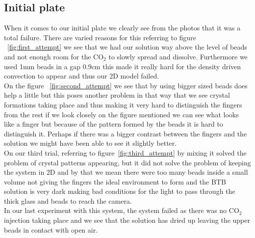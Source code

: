 \documentclass[twoside]{article}
\begin{document}
\begin{multicols}{2}
\subsection{Initial plate}
When it comes to our initial plate we clearly see from the photos that it was a total failure. There are varied reasons for this referring to figure ~\ref{fig:first_attempt} we see that we had our solution way above the level of beads and not enough room for the CO$_2$ to slowly spread and dissolve. Furthermore we used 1mm beads in a gap $0.9$cm this made it really hard for the density driven convection to appear and thus our 2D model failed. \\
On the figure ~\ref{fig:second_attempt} we see that by using bigger sized beads does help a little but this poses another problem in that way that we see crystal formations taking place and thus making it very hard to distinguish the fingers from the rest if we look closely on the figure mentioned we can see what looks like a finger but because of the pattern formed by the beads it is hard to distinguish it. Perhaps if there was a bigger contrast between the fingers and the solution we might have been able to see it slightly better. \\
On our third trial, referring to figure~\ref{fig:third_attempt} by mixing it solved the problem of crystal patterns appearing, but it did not solve the problem of keeping the system in 2D and by that we mean there were too many beads inside a small volume not giving the fingers the ideal environment to form and the BTB solution is very dark making bad conditions for the light to pass through the thick glass and beads to reach the camera.\\ 
In our last experiment with this system, the system failed as there was no CO$_2$ injection taking place and we see that the solution has dried up leaving the upper beads in contact with open air. 


\end{multicols}
\end{document}
